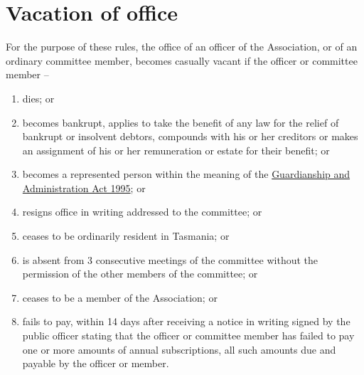 \documentclass[a4paper,11pt]{article}
\begin{document}
\section{Vacation of office}
For the purpose of these rules, the office of an officer of the Association, or of an ordinary committee member, becomes casually vacant if the officer or committee member --
\begin{enumerate}
	\item dies; or
	\item becomes bankrupt, applies to take the benefit of any law for the relief of bankrupt or insolvent debtors, compounds with his or her creditors or makes an assignment of his or her remuneration or estate for their benefit; or
	\item becomes a represented person within the meaning of the \href{https://www.legislation.tas.gov.au/view/html/inforce/current/act-1995-044}{Guardianship and Administration Act 1995}; or
	\item resigns office in writing addressed to the committee; or
	\item ceases to be ordinarily resident in Tasmania; or
	\item is absent from 3 consecutive meetings of the committee without the permission of the other members of the committee; or
	\item ceases to be a member of the Association; or
	\item fails to pay, within 14 days after receiving a notice in writing signed by the public officer stating that the officer or committee member has failed to pay one or more amounts of annual subscriptions, all such amounts due and payable by the officer or member.
\end{enumerate}
\end{document}

